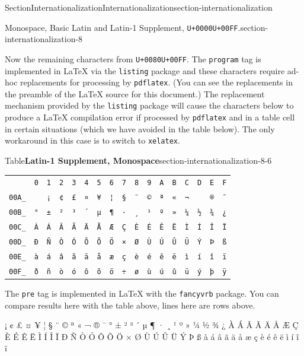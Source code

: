 \documentclass[twoside,10pt,]{article}
\newcommand{\tabularfont}{\relax}
\newcommand{\mono}[1]{\texttt{#1}}
\numberwithin{equation}{section}
\begin{document}
\begin{sectionptx}{Section}{Internationalization}{}{Internationalization}{}{}{section-internationalization}
\begin{paragraphs}{Monospace, Basic Latin and Latin-1 Supplement, \mono{U+0000}\textendash{}\mono{U+00FF}.}{section-internationalization-8}
\par
Now the remaining characters from \mono{U+0080}\textendash{}\mono{U+00FF}.  The \mono{program} tag is implemented in \LaTeX{} via the \mono{listing} package and these characters require ad-hoc replacements for processing by \mono{pdflatex}.  (You can see the replacements in the preamble of the \LaTeX{} source for this document.)  The replacement mechanism provided by the \mono{listing} package will cause the characters below to produce a \LaTeX{} compilation error if processed by \mono{pdflatex} and in a table cell in certain situations (which we have avoided in the table below).  The only workaround in this case is to switch to \mono{xelatex}.%
\begin{tableptx}{Table}{\textbf{Latin-1 Supplement, Monospace}}{section-internationalization-8-6}{}%
\centering%
{\tabularfont%
\begin{tabular}{lllllllllllllllll}
&\mono{0}&\mono{1}&\mono{2}&\mono{3}&\mono{4}&\mono{5}&\mono{6}&\mono{7}&\mono{8}&\mono{9}&\mono{A}&\mono{B}&\mono{C}&\mono{D}&\mono{E}&\mono{F}\tabularnewline[0pt]
\mono{00A\_}&&\mono{¡}&\mono{¢}&\mono{£}&\mono{¤}&\mono{¥}&\mono{¦}&\mono{§}&\mono{¨}&\mono{©}&\mono{ª}&\mono{«}&\mono{¬}&&\mono{®}&\mono{¯}\tabularnewline[0pt]
\mono{00B\_}&\mono{°}&\mono{±}&\mono{²}&\mono{³}&\mono{´}&\mono{µ}&\mono{¶}&\mono{·}&\mono{¸}&\mono{¹}&\mono{º}&\mono{»}&\mono{¼}&\mono{½}&\mono{¾}&\mono{¿}\tabularnewline[0pt]
\mono{00C\_}&\mono{À}&\mono{Á}&\mono{Â}&\mono{Ã}&\mono{Ä}&\mono{Å}&\mono{Æ}&\mono{Ç}&\mono{È}&\mono{É}&\mono{Ê}&\mono{Ë}&\mono{Ì}&\mono{Í}&\mono{Î}&\mono{Ï}\tabularnewline[0pt]
\mono{00D\_}&\mono{Ð}&\mono{Ñ}&\mono{Ò}&\mono{Ó}&\mono{Ô}&\mono{Õ}&\mono{Ö}&\mono{×}&\mono{Ø}&\mono{Ù}&\mono{Ú}&\mono{Û}&\mono{Ü}&\mono{Ý}&\mono{Þ}&\mono{ß}\tabularnewline[0pt]
\mono{00E\_}&\mono{à}&\mono{á}&\mono{â}&\mono{ã}&\mono{ä}&\mono{å}&\mono{æ}&\mono{ç}&\mono{è}&\mono{é}&\mono{ê}&\mono{ë}&\mono{ì}&\mono{í}&\mono{î}&\mono{ï}\tabularnewline[0pt]
\mono{00F\_}&\mono{ð}&\mono{ñ}&\mono{ò}&\mono{ó}&\mono{ô}&\mono{õ}&\mono{ö}&\mono{÷}&\mono{ø}&\mono{ù}&\mono{ú}&\mono{û}&\mono{ü}&\mono{ý}&\mono{þ}&\mono{ÿ}
\end{tabular}
}%
\end{tableptx}%
The \mono{pre} tag is implemented in \LaTeX{} with the \mono{fancyvrb} package.  You can compare results here with the table above, lines here are rows above.%
\begin{preformatted}
  ¡ ¢ £ ¤ ¥ ¦ § ¨ © ª « ¬   ® ¯
° ± ² ³ ´ µ ¶ · ¸ ¹ º » ¼ ½ ¾ ¿
À Á Â Ã Ä Å Æ Ç È É Ê Ë Ì Í Î Ï
Ð Ñ Ò Ó Ô Õ Ö × Ø Ù Ú Û Ü Ý Þ ß
à á â ã ä å æ ç è é ê ë ì í î ï

\end{preformatted}
\end{paragraphs}
\end{sectionptx}
\end{document}

